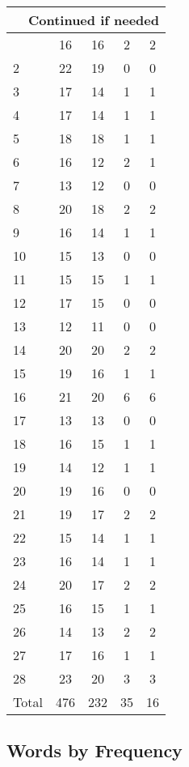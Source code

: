 \begin{center}
\begin{longtable}{l|c|c|c|c}
\hline \multicolumn{5}{|r|}{{Continued if needed}} \\ \hline
\endfoot 
1 & 16 & 16 & 2 & 2\\ \hline
2 & 22 & 19 & 0 & 0\\ \hline
3 & 17 & 14 & 1 & 1\\ \hline
4 & 17 & 14 & 1 & 1\\ \hline
5 & 18 & 18 & 1 & 1\\ \hline
6 & 16 & 12 & 2 & 1\\ \hline
7 & 13 & 12 & 0 & 0\\ \hline
8 & 20 & 18 & 2 & 2\\ \hline
9 & 16 & 14 & 1 & 1\\ \hline
10 & 15 & 13 & 0 & 0\\ \hline
11 & 15 & 15 & 1 & 1\\ \hline
12 & 17 & 15 & 0 & 0\\ \hline
13 & 12 & 11 & 0 & 0\\ \hline
14 & 20 & 20 & 2 & 2\\ \hline
15 & 19 & 16 & 1 & 1\\ \hline
16 & 21 & 20 & 6 & 6\\ \hline
17 & 13 & 13 & 0 & 0\\ \hline
18 & 16 & 15 & 1 & 1\\ \hline
19 & 14 & 12 & 1 & 1\\ \hline
20 & 19 & 16 & 0 & 0\\ \hline
21 & 19 & 17 & 2 & 2\\ \hline
22 & 15 & 14 & 1 & 1\\ \hline
23 & 16 & 14 & 1 & 1\\ \hline
24 & 20 & 17 & 2 & 2\\ \hline
25 & 16 & 15 & 1 & 1\\ \hline
26 & 14 & 13 & 2 & 2\\ \hline
27 & 17 & 16 & 1 & 1\\ \hline
28 & 23 & 20 & 3 & 3\\ \hline
\hline \hline
Total & 476 & 232 & 35 & 16




\end{longtable}
\end{center}



\subsection{Words by Frequency}

